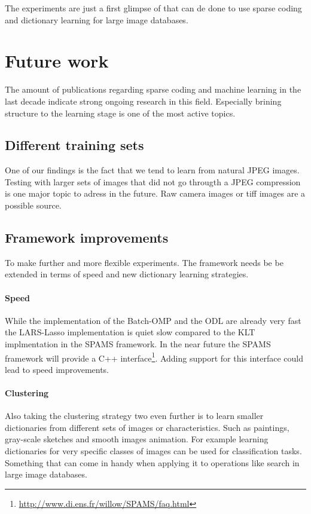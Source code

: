 The experiments are just a first glimpse of that can de done to use sparse
coding and dictionary learning for large image databases.


\section{Future work}
The amount of publications regarding sparse coding and machine learning in the
last decade indicate strong ongoing research in this field. Especially
brining structure to the learning stage is one of the most active topics.

\subsection{Different training sets}
One of our findings is the fact that we tend to learn from natural JPEG images.
Testing with larger sets of images that did not go througth a JPEG compression
is one major topic to adress in the future. Raw camera images or tiff images
are a possible source. 

\subsection{Framework improvements}
To make further and more flexible experiments. The framework needs be be
extended in terms of speed and new dictionary learning strategies.

\paragraph{Speed}
While the implementation of the Batch-OMP and the ODL are already very fast
the LARS-Lasso implementation is quiet slow compared to the KLT implmentation in
the SPAMS framework. In the near future the SPAMS framework will provide a C++
interface\footnote{\url{http://www.di.ens.fr/willow/SPAMS/faq.html}}. Adding
support for this interface could lead to speed improvements.

\paragraph{Clustering}
Also taking the clustering strategy two even further is to learn smaller
dictionaries from different sets of images or characteristics. Such as
paintings, gray-scale sketches and smooth images animation. For example learning
dictionaries for very specific classes of images can be used for classification
tasks. Something that can come in handy when applying it to operations like
search in large image databases.

